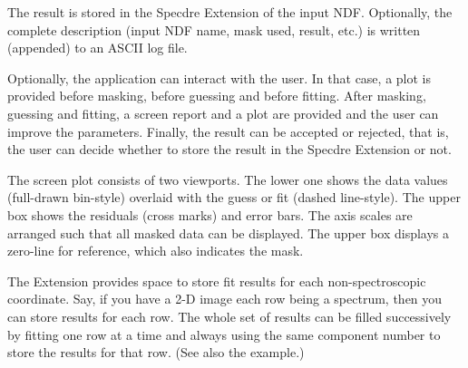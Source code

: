 {{      The result is stored in the Specdre Extension of the input NDF.
      Optionally, the complete description (input NDF name, mask used,
      result, etc.) is written (appended) to an ASCII log file.

      Optionally, the application can interact with the user. In that
      case, a plot is provided before masking, before guessing and
      before fitting. After masking, guessing and fitting, a screen
      report and a plot are provided and the user can improve the
      parameters. Finally, the result can be accepted or rejected, that
      is, the user can decide whether to store the result in the Specdre
      Extension or not.

      The screen plot consists of two viewports. The lower one shows the
      data values (full-drawn bin-style) overlaid with the guess or fit
      (dashed line-style). The upper box shows the residuals (cross
      marks) and error bars. The axis scales are arranged such that
      all masked data can be displayed. The upper box displays a
      zero-line for reference, which also indicates the mask.

      The Extension provides space to store fit results for each
      non-spectroscopic coordinate. Say, if you have a 2-D image each
      row being a spectrum, then you can store results for each row. The
      whole set of results can be filled successively by fitting one row
      at a time and always using the same component number to store the
      results for that row. (See also the example.)

}}
